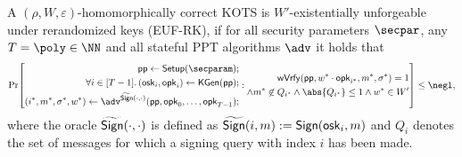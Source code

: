 \begin{definition}
  A $(\rho,W,\varepsilon)$-homomorphically correct KOTS is $W'$-existentially unforgeable under rerandomized keys (EUF-RK), if for all security parameters $\secpar$, any $T=\poly\in\NN$ and all stateful PPT algorithms $\adv$ it holds that
  \[
    \Pr\mleft[
      \begin{aligned}
      \params \gets \setup(\secparam);\\
      \forall i \in [T-1]\ldotp (\osk_i,\opk_i) \gets \kgen(\params);\\
      (i^*,m^*,\sigma^*,w^*) \gets \adv^{\widetilde\sign(\cdot,\cdot)}(\params,\opk_0,\dots,\opk_{T-1});\\
      \end{aligned}:
      \begin{aligned}
      \wverify(\params,w^*\cdot\opk_{i^*},m^*,\sigma^*) = 1\\
      \land m^*\not\in Q_{i^*} \land \abs{Q_{i^*}}\leq 1 \land w^* \in W'
      \end{aligned}
    \mright]\leq \negl,
  \]
  where the oracle $\widetilde{\mathsf{Sign}}(\cdot,\cdot)$ is defined as $\widetilde{\mathsf{Sign}}(i,m) := \mathsf{Sign}(\mathsf{osk}_i,m)$ and $Q_i$ denotes the set of messages for which a signing query with index $i$ has been made.
\end{definition}

